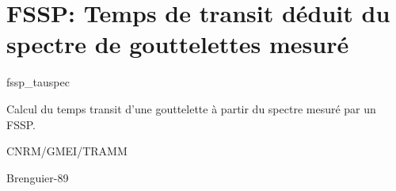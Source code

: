%
\section{FSSP: Temps de transit d\'eduit du spectre de gouttelettes
mesur\'e}

 {\sf fssp\_tauspec}

Calcul du temps transit d'une gouttelette \`a partir
du spectre mesur\'e par un FSSP.  

\bigskip





CNRM/GMEI/TRAMM

Brenguier-89 \cite{Brenguier-89}
